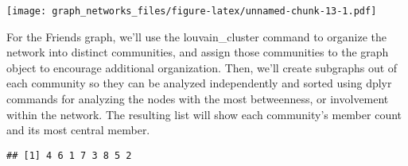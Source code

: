 \documentclass[]{article}
\newenvironment{Shaded}{\begin{snugshade}}{\end{snugshade}}
\newcommand{\KeywordTok}[1]{\textcolor[rgb]{0.13,0.29,0.53}{\textbf{#1}}}
\newcommand{\DataTypeTok}[1]{\textcolor[rgb]{0.13,0.29,0.53}{#1}}
\newcommand{\StringTok}[1]{\textcolor[rgb]{0.31,0.60,0.02}{#1}}
\newcommand{\CommentTok}[1]{\textcolor[rgb]{0.56,0.35,0.01}{\textit{#1}}}
\newcommand{\OperatorTok}[1]{\textcolor[rgb]{0.81,0.36,0.00}{\textbf{#1}}}
\newcommand{\NormalTok}[1]{#1}
\begin{document}
\texttt{[image: graph\_networks\_files/figure-latex/unnamed-chunk-13-1.pdf]}

For the Friends graph, we'll use the louvain\_cluster command to
organize the network into distinct communities, and assign those
communities to the graph object to encourage additional organization.
Then, we'll create subgraphs out of each community so they can be
analyzed independently and sorted using dplyr commands for analyzing the
nodes with the most betweenness, or involvement within the network. The
resulting list will show each community's member count and its most
central member.

\begin{Shaded}
\end{Shaded}

\begin{verbatim}
## [1] 4 6 1 7 3 8 5 2
\end{verbatim}
\end{document}
